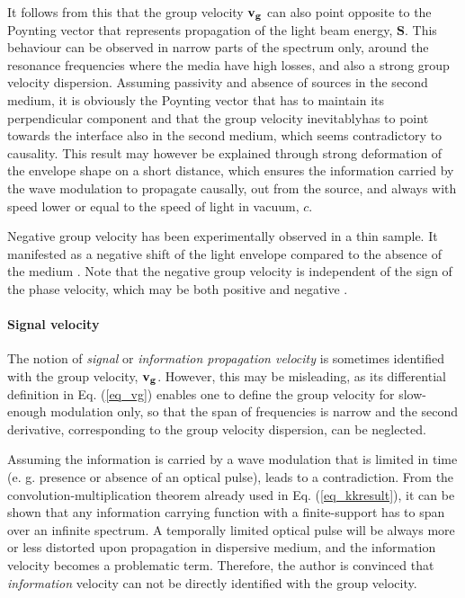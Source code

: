 It follows from this that the group velocity ${\mathbf{v_g}}$ can also point opposite to the Poynting vector that represents propagation of the light beam energy, $\mathbf{S}$. 
This behaviour can be observed in narrow parts of the spectrum only, around the resonance frequencies where the media have high losses, and also a strong group velocity dispersion.
Assuming passivity and absence of sources in the second medium, it is obviously the Poynting vector that has to maintain its perpendicular component and that the group velocity   inevitablyhas to point towards the interface also in the second medium, which seems contradictory to causality.
This result 
may however be explained through strong deformation of the envelope shape on a short distance, which ensures the information carried by the wave modulation to propagate causally, out from the source, and always with speed lower or equal to the speed of light in vacuum, $c$.

Negative group velocity has been experimentally observed in a thin sample. It manifested as a negative shift of the light envelope compared to the absence of the medium \cite{dolling2006simultaneous}. Note that the negative group velocity is independent of the sign of the phase velocity, which may be both positive and negative \cite{mikki2009electromagnetic}.

\paragraph{Signal velocity}%
The notion of \textit{signal} or \textit{information propagation velocity} is sometimes %
identified with the group velocity, ${\mathbf{v_g}}$. However, this may be misleading, as its differential definition in Eq. (\ref{eq_vg}) enables one to define the group velocity for slow-enough modulation only, so that the span of frequencies is narrow and the second derivative, corresponding to the group velocity dispersion, can be neglected.

Assuming the information is carried by a wave modulation that is limited in time (e. g. presence or absence of an optical pulse), leads to a contradiction. From the convolution-multiplication theorem already used in Eq. (\ref{eq_kkresult}), it can be shown that any information carrying function with a finite-support has to span over an infinite spectrum. 
A temporally limited optical pulse will be always more or less distorted upon propagation in dispersive medium, and the information velocity becomes a problematic term.
Therefore, the author is convinced that \textit{information} velocity can not be directly identified with the group velocity. 

